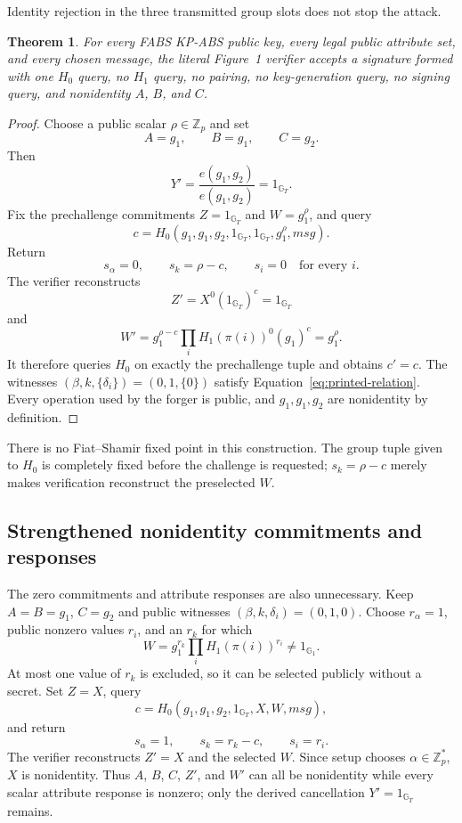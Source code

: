 \documentclass[10pt,a4paper]{article}
\newtheorem{theorem}{Theorem}
\newcommand{\Zp}{\mathbb{Z}_p}
\newcommand{\gone}{\mathbb{G}_1}
\newcommand{\gthree}{\mathbb{G}_T}
\newcommand{\oneone}{1_{\gone}}
\newcommand{\onethree}{1_{\gthree}}
\begin{document}
Identity rejection in the three transmitted group slots does not stop the
attack.

\begin{theorem}\label{thm:nonidentity}
For every FABS KP-ABS public key, every legal public attribute set, and every
chosen message, the literal Figure~1 verifier accepts a signature formed with
one $H_0$ query, no $H_1$ query, no pairing, no key-generation query, no
signing query, and nonidentity $A$, $B$, and $C$.
\end{theorem}

\begin{proof}
Choose a public scalar $\rho\in\Zp$ and set
\[
A=g_1,\qquad B=g_1,\qquad C=g_2.
\]
Then
\[
Y'=\frac{e(g_1,g_2)}{e(g_1,g_2)}=\onethree.
\]
Fix the prechallenge commitments $Z=\onethree$ and $W=g_1^\rho$, and query
\[
c=H_0(g_1,g_1,g_2,\onethree,\onethree,g_1^\rho,
      \mathit{msg}).
\]
Return
\[
s_\alpha=0,\qquad s_k=\rho-c,\qquad s_i=0
\quad\text{for every }i.
\]
The verifier reconstructs
\[
Z'=X^0(\onethree)^c=\onethree
\]
and
\[
W'=g_1^{\rho-c}\prod_i H_1(\pi(i))^0(g_1)^c=g_1^\rho.
\]
It therefore queries $H_0$ on exactly the prechallenge tuple and obtains
$c'=c$. The witnesses $(\beta,k,\{\delta_i\})=(0,1,\{0\})$ satisfy
Equation~\eqref{eq:printed-relation}. Every operation used by the forger is
public, and $g_1,g_1,g_2$ are nonidentity by definition.
\end{proof}

There is no Fiat--Shamir fixed point in this construction. The group tuple
given to $H_0$ is completely fixed before the challenge is requested;
$s_k=\rho-c$ merely makes verification reconstruct the preselected $W$.

\subsection{Strengthened nonidentity commitments and responses}

The zero commitments and attribute responses are also unnecessary. Keep
$A=B=g_1$, $C=g_2$ and public witnesses
$(\beta,k,\delta_i)=(0,1,0)$. Choose $r_\alpha=1$, public nonzero values
$r_i$, and an $r_k$ for which
\[
W=g_1^{r_k}\prod_i H_1(\pi(i))^{r_i}\ne\oneone.
\]
At most one value of $r_k$ is excluded, so it can be selected publicly without
a secret. Set $Z=X$, query
\[
c=H_0(g_1,g_1,g_2,\onethree,X,W,\mathit{msg}),
\]
and return
\[
s_\alpha=1,\qquad s_k=r_k-c,\qquad s_i=r_i.
\]
The verifier reconstructs $Z'=X$ and the selected $W$. Since setup chooses
$\alpha\in\Zp^*$, $X$ is nonidentity. Thus $A$, $B$, $C$, $Z'$, and $W'$ can
all be nonidentity while every scalar attribute response is nonzero; only the
derived cancellation $Y'=\onethree$ remains.
\end{document}
